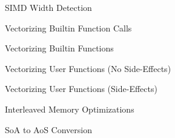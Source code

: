 
\begin{frame}{SIMD Width Detection}

\end{frame}


\begin{frame}{Vectorizing Builtin Function Calls}


\end{frame}


\begin{frame}{Vectorizing Builtin Functions}


\end{frame}


\begin{frame}{Vectorizing User Functions (No Side-Effects)}


\end{frame}


\begin{frame}{Vectorizing User Functions (Side-Effects)}


\end{frame}


\begin{frame}{Interleaved Memory Optimizations}

\end{frame}


\begin{frame}{SoA to AoS Conversion}

\end{frame}
